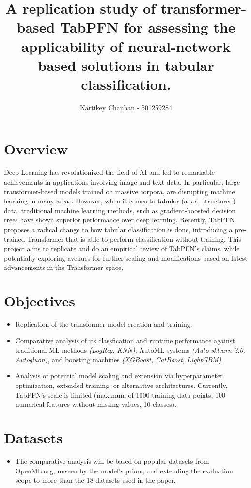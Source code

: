 \documentclass[a4paper]{article}
\title{A replication study of transformer-based TabPFN for assessing the applicability of neural-network based solutions in tabular classification.
}
\author{Kartikey Chauhan - 501259284}
\date{}
\begin{document}
\maketitle
\section*{Overview}
Deep Learning has revolutionized the field of AI and led to remarkable achievements in applications involving image and text data. In particular, large transformer-based models trained on massive corpora, are disrupting machine learning in many areas. However, when it comes to tabular (a.k.a. structured) data, traditional machine learning methods, such as gradient-boosted decision trees have shown superior performance over deep learning. 
Recently, TabPFN~\cite{hollmann2023tabpfn} proposes a radical change to how tabular classification is done, introducing a pre-trained Transformer that is able to perform classification without training. This project aims to replicate and do an empirical review of TabPFN's claims, while potentially exploring avenues for further scaling and modifications based on latest advancements in the Transformer space.

\section*{Objectives}

\begin{itemize}
\item Replication of the transformer model creation and training.
\item Comparative analysis of its classfication and runtime performance against traditional ML methods \textit{(LogReg, KNN)}, AutoML systems \textit{(Auto-sklearn 2.0, Autogluon)}, and boosting machines \textit{(XGBoost, CatBoost, LightGBM)}.
\item Analysis of potential model scaling and extension via hyperparameter optimization, extended training, or alternative architectures. Currently, TabPFN's scale is limited (maximum of 1000 training data points, 100 numerical features without missing values, 10 classes).
\end{itemize}
\section*{Datasets}
\begin{itemize}
\item The comparative analysis will be based on popular datasets from \href{https://openml.org/search?type=data&sort=runs&status=active}{OpenML.org}, unseen by the model's priors, and extending the evaluation scope to more than the 18 datasets used in the paper. 
\end{itemize}
\end{document}
